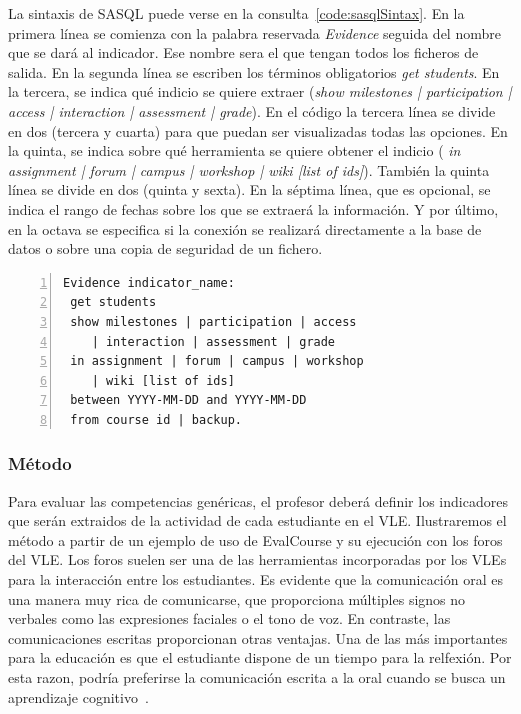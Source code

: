 La sintaxis de SASQL puede verse en la consulta~\ref{code:sasqlSintax}. En la primera línea se comienza con la palabra reservada \emph{Evidence} seguida del nombre que se dará al indicador. Ese nombre sera el que tengan todos los ficheros de salida. En la segunda línea se escriben los términos obligatorios \emph{get students}. En la tercera, se indica qué indicio se quiere extraer (\emph{show milestones | participation | access | interaction | assessment | grade}). En el código la tercera línea se divide en dos (tercera y cuarta) para que puedan ser visualizadas todas las opciones. En la quinta, se indica sobre qué herramienta se quiere obtener el indicio (\emph{ in assignment | forum | campus | workshop | wiki [list of ids]}). También la quinta línea se divide en dos (quinta y sexta). En la séptima línea, que es opcional, se indica el rango de fechas sobre los que se extraerá la información. Y por último, en la octava se especifica si la conexión se realizará directamente a la base de datos o sobre una copia de seguridad de un fichero.

\begin{lstlisting}[caption=Sintaxis de SASQL (las palabras reservadas se muestran resaltadas),label=code:sasqlSintax,numbers=left, captionpos=b, morekeywords={Evidence,get, students, show, milestones, participation, access, in, assignment, forum, campus, wiki, between, and, workshop, interaction, assessment, grade, from, course, backup}]
Evidence indicator_name:
 get students 
 show milestones | participation | access 
	| interaction | assessment | grade
 in assignment | forum | campus | workshop 
	| wiki [list of ids]
 between YYYY-MM-DD and YYYY-MM-DD
 from course id | backup.
\end{lstlisting}

\subsubsection{Método}

Para evaluar las competencias genéricas, el profesor deberá definir los indicadores que serán extraidos de la actividad de cada estudiante en el VLE. Ilustraremos el método a partir de un ejemplo de uso de EvalCourse y su ejecución con los foros del VLE. Los foros suelen ser una de las herramientas incorporadas por los VLEs para la interacción entre los estudiantes. Es evidente que la comunicación oral es una manera muy rica de comunicarse, que proporciona múltiples signos no verbales como las expresiones faciales o el tono de voz. En contraste, las comunicaciones escritas proporcionan otras ventajas. Una de las más importantes para la educación es que el estudiante dispone de un tiempo para la relfexión. Por esta razon, podría preferirse la comunicación escrita a la oral cuando se busca un aprendizaje cognitivo~\cite{garrison1999critical}.

